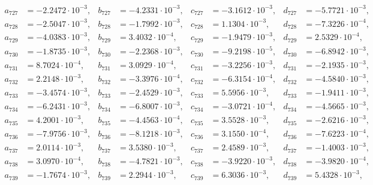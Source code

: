 \begin{align*}
  a_{ 727 } &= -2.2472 \cdot 10^{ -3 }, & b_{ 727 } &= -4.2331 \cdot 10^{ -3 }, & c_{ 727 } &= -3.1612 \cdot 10^{ -3 }, & d_{ 727 } &= -5.7721 \cdot 10^{ -3 }, \\ 
  a_{ 728 } &= -2.5047 \cdot 10^{ -3 }, & b_{ 728 } &= -1.7992 \cdot 10^{ -3 }, & c_{ 728 } &= 1.1304 \cdot 10^{ -3 }, & d_{ 728 } &= -7.3226 \cdot 10^{ -4 }, \\ 
  a_{ 729 } &= -4.0383 \cdot 10^{ -3 }, & b_{ 729 } &= 3.4032 \cdot 10^{ -4 }, & c_{ 729 } &= -1.9479 \cdot 10^{ -3 }, & d_{ 729 } &= 2.5329 \cdot 10^{ -4 }, \\ 
  a_{ 730 } &= -1.8735 \cdot 10^{ -3 }, & b_{ 730 } &= -2.2368 \cdot 10^{ -3 }, & c_{ 730 } &= -9.2198 \cdot 10^{ -5 }, & d_{ 730 } &= -6.8942 \cdot 10^{ -3 }, \\ 
  a_{ 731 } &= 8.7024 \cdot 10^{ -4 }, & b_{ 731 } &= 3.0929 \cdot 10^{ -4 }, & c_{ 731 } &= -3.2256 \cdot 10^{ -3 }, & d_{ 731 } &= -2.1935 \cdot 10^{ -3 }, \\ 
  a_{ 732 } &= 2.2148 \cdot 10^{ -3 }, & b_{ 732 } &= -3.3976 \cdot 10^{ -4 }, & c_{ 732 } &= -6.3154 \cdot 10^{ -4 }, & d_{ 732 } &= -4.5840 \cdot 10^{ -3 }, \\ 
  a_{ 733 } &= -3.4574 \cdot 10^{ -3 }, & b_{ 733 } &= -2.4529 \cdot 10^{ -3 }, & c_{ 733 } &= 5.5956 \cdot 10^{ -3 }, & d_{ 733 } &= -1.9411 \cdot 10^{ -3 }, \\ 
  a_{ 734 } &= -6.2431 \cdot 10^{ -3 }, & b_{ 734 } &= -6.8007 \cdot 10^{ -3 }, & c_{ 734 } &= -3.0721 \cdot 10^{ -4 }, & d_{ 734 } &= -4.5665 \cdot 10^{ -3 }, \\ 
  a_{ 735 } &= 4.2001 \cdot 10^{ -3 }, & b_{ 735 } &= -4.4563 \cdot 10^{ -4 }, & c_{ 735 } &= 3.5528 \cdot 10^{ -3 }, & d_{ 735 } &= -2.6216 \cdot 10^{ -3 }, \\ 
  a_{ 736 } &= -7.9756 \cdot 10^{ -3 }, & b_{ 736 } &= -8.1218 \cdot 10^{ -3 }, & c_{ 736 } &= 3.1550 \cdot 10^{ -4 }, & d_{ 736 } &= -7.6223 \cdot 10^{ -4 }, \\ 
  a_{ 737 } &= 2.0114 \cdot 10^{ -3 }, & b_{ 737 } &= 3.5380 \cdot 10^{ -3 }, & c_{ 737 } &= 2.4589 \cdot 10^{ -3 }, & d_{ 737 } &= -1.4003 \cdot 10^{ -3 }, \\ 
  a_{ 738 } &= 3.0970 \cdot 10^{ -4 }, & b_{ 738 } &= -4.7821 \cdot 10^{ -3 }, & c_{ 738 } &= -3.9220 \cdot 10^{ -3 }, & d_{ 738 } &= -3.9820 \cdot 10^{ -4 }, \\ 
  a_{ 739 } &= -1.7674 \cdot 10^{ -3 }, & b_{ 739 } &= 2.2944 \cdot 10^{ -3 }, & c_{ 739 } &= 6.3036 \cdot 10^{ -3 }, & d_{ 739 } &= 5.4328 \cdot 10^{ -3 }, \\ 

\end{align*}
